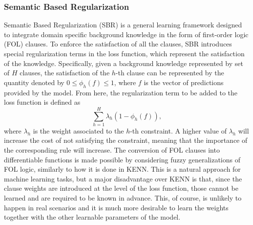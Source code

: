  \subsubsection{Semantic Based Regularization}
 Semantic Based Regularization (SBR) is a general learning framework designed to integrate domain specific background knowledge in the form of first-order logic (FOL) clauses. To enforce the satisfaction of all the clauses, SBR introduces special regularization terms in the loss function, which represent the satisfaction of the knowledge. Specifically, given a background knowledge represented by set of $H$ clauses, the satisfaction of the $h$-th clause can be represented by the quantity denoted by $0 \leq \phi_h(f) \leq 1$, \textcolor{unipd}{where $f$ is the vector of predictions provided by the model}. From here, the regularization term to be added to the loss function is defined as
 $$ \sum_{h=1}^H \lambda_h(1 - \phi_h(f)), $$
 where $\lambda_h$ is the weight associated to the $h$-th constraint. A higher value of $\lambda_h$ will increase the cost of not satisfying the constraint, meaning that the importance of the corresponding rule will increase. The conversion of FOL clauses into differentiable functions is made possible by considering fuzzy generalizations of FOL logic, similarly to how it is done in KENN. This is a natural approach for machine learning tasks, but a major disadvantage over KENN is that, since the clause weights are introduced at the level of the loss function, those cannot be learned and are required to be known in advance. This, of course, is unlikely to happen in real scenarios and it is much more desirable to learn the weights together with the other learnable parameters of the model.
 
